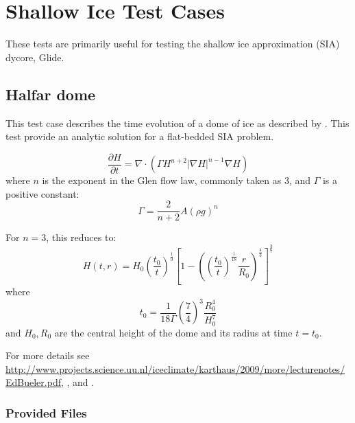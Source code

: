 
\section{Shallow Ice Test Cases}
\label{sc:sia-tests}

These tests are primarily useful for testing the shallow ice approximation (SIA) dycore, Glide.


\subsection{Halfar dome}

\label{sec:halfar_description}
This test case describes the time evolution of a dome of ice as described by \citet{Halfar1983}.
This test provide an analytic solution for a flat-bedded SIA problem.

\begin{equation}
    \label{halfar}
    \frac{\partial H}{\partial t} = \nabla \cdot (\Gamma H^{n+2} |\nabla H|^{n-1} \nabla H)
\end{equation}
where $n$ is the exponent in the Glen flow law, commonly taken as 3, and $\Gamma$ is a positive constant:
\begin{equation}
    \Gamma = \frac{2}{n+2} A (\rho g)^n
\end{equation}

For $n=3$, this reduces to:
\begin{equation}
    H(t,r) = H_0 \left(\frac{t_0}{t}\right)^\frac{1}{9}  \left[ 1 - \left(  \left( \frac{t_0}{t} \right) ^ \frac{1}{18} \frac{r}{R_0} \right)^\frac{4}{3} \right] ^ \frac{3}{7}
\end{equation}
where
\begin{equation}
    t_0 = \frac{1}{18\Gamma} \left( \frac{7}{4} \right)^3 \frac{R_0^4}{H_0^7}
\end{equation}
and $H_0, R_0$ are the central height of the dome and its radius at time $t=t_0$.

For more details see \url{http://www.projects.science.uu.nl/iceclimate/karthaus/2009/more/lecturenotes/EdBueler.pdf},  \citet{Bueler2005}, and \citet{Halfar1983}.



\subsubsection{Provided Files}
\label{subsec:halfar_files}

